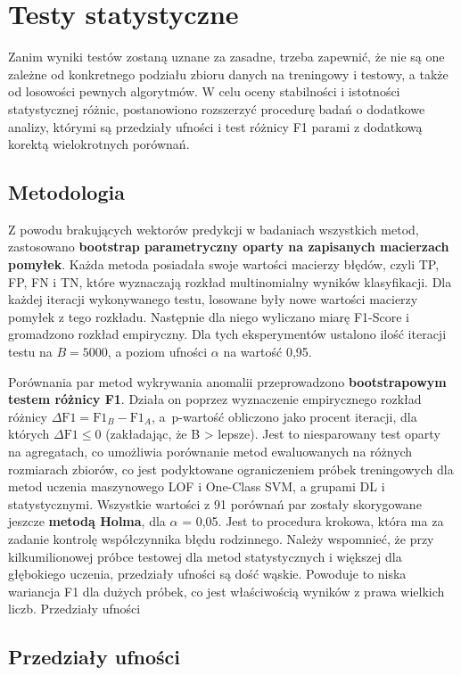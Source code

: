 \documentclass[a4paper,twoside,12pt]{book}
\begin{document}
	
	\section{Testy statystyczne}
	Zanim wyniki testów zostaną uznane za zasadne, trzeba zapewnić, że nie są one zależne od konkretnego podziału zbioru danych na treningowy i testowy, a także od losowości pewnych algorytmów. W celu oceny stabilności i istotności statystycznej różnic, postanowiono rozszerzyć procedurę badań o dodatkowe analizy, którymi są przedziały ufności i test różnicy F1 parami z dodatkową korektą wielokrotnych porównań. 
	
	\subsection{Metodologia}
	Z powodu brakujących wektorów predykcji w badaniach wszystkich metod, zastosowano \textbf{bootstrap parametryczny oparty na zapisanych macierzach pomyłek}. Każda metoda posiadała swoje wartości macierzy błędów, czyli TP, FP, FN i TN, które wyznaczają rozkład multinomialny wyników klasyfikacji. Dla każdej iteracji wykonywanego testu, losowane były nowe wartości macierzy pomyłek z tego rozkładu. Następnie dla niego wyliczano miarę F1-Score i gromadzono rozkład empiryczny. Dla tych eksperymentów ustalono ilość iteracji testu na $B = 5000$, a poziom ufności $\alpha$ na wartość 0{,}95.
	
	Porównania par metod wykrywania anomalii przeprowadzono  \textbf{bootstrapowym testem różnicy F1}. Działa on poprzez wyznaczenie empirycznego rozkład różnicy $\Delta\text{F1} = \text{F1}_B - \text{F1}_A$, a~p-wartość obliczono jako procent iteracji, dla których $\Delta\text{F1} \leq 0$ (zakładając, że B > lepsze). Jest to niesparowany test oparty na agregatach, co umożliwia porównanie metod ewaluowanych na różnych rozmiarach zbiorów, co jest podyktowane ograniczeniem próbek treningowych dla metod uczenia maszynowego LOF i One-Class SVM, a grupami DL i statystycznymi. Wszystkie wartości z 91 porównań par zostały skorygowane jeszcze \textbf{metodą Holma}, dla $\alpha$ = 0{,}05. Jest to procedura krokowa, która ma za zadanie kontrolę współczynnika błędu rodzinnego. Należy wspomnieć, że przy kilkumilionowej próbce testowej dla metod statystycznych i większej dla głębokiego uczenia, przedziały ufności są dość wąskie. Powoduje to niska wariancja F1 dla dużych próbek, co jest właściwością wyników z prawa wielkich liczb.   
	Przedziały ufności
	
	\subsection{Przedziały ufności}
	
\end{document}
